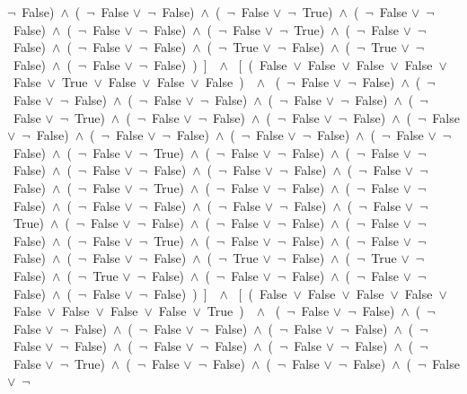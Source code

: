 ﻿\documentclass[a4paper,10pt]{article}
\begin{document}
$\neg$\ False)\ $\wedge$\ (\  $\neg$\ False $\vee$\  $\neg$\ False)\ $\wedge$\ (\  $\neg$\ False $\vee$\  $\neg$\ True)\ $\wedge$\ (\  $\neg$\ False $\vee$\  $\neg$\ False)\ $\wedge$\ (\  $\neg$\ False $\vee$\  $\neg$\ False)\ $\wedge$\ (\  $\neg$\ False $\vee$\  $\neg$\ True)\ $\wedge$\ (\  $\neg$\ False $\vee$\  $\neg$\ False)\ $\wedge$\ (\  $\neg$\ False $\vee$\  $\neg$\ False)\ $\wedge$\ (\  $\neg$\ True $\vee$\  $\neg$\ False)\ $\wedge$\ (\  $\neg$\ True $\vee$\  $\neg$\ False)\ $\wedge$\ (\  $\neg$\ False $\vee$\  $\neg$\ False)\ )\ ]\ \ $\wedge$ \ [\ (\ False\ $\vee$\ False\ $\vee$\ False\ $\vee$\ False\ $\vee$\ False\ $\vee$\ True\ $\vee$\ False\ $\vee$\ False\ $\vee$\ False\ )\ \ $\wedge$ \ (\  $\neg$\ False $\vee$\  $\neg$\ False)\ $\wedge$\ (\  $\neg$\ False $\vee$\  $\neg$\ False)\ $\wedge$\ (\  $\neg$\ False $\vee$\  $\neg$\ False)\ $\wedge$\ (\  $\neg$\ False $\vee$\  $\neg$\ False)\ $\wedge$\ (\  $\neg$\ False $\vee$\  $\neg$\ True)\ $\wedge$\ (\  $\neg$\ False $\vee$\  $\neg$\ False)\ $\wedge$\ (\  $\neg$\ False $\vee$\  $\neg$\ False)\ $\wedge$\ (\  $\neg$\ False $\vee$\  $\neg$\ False)\ $\wedge$\ (\  $\neg$\ False $\vee$\  $\neg$\ False)\ $\wedge$\ (\  $\neg$\ False $\vee$\  $\neg$\ False)\ $\wedge$\ (\  $\neg$\ False $\vee$\  $\neg$\ False)\ $\wedge$\ (\  $\neg$\ False $\vee$\  $\neg$\ True)\ $\wedge$\ (\  $\neg$\ False $\vee$\  $\neg$\ False)\ $\wedge$\ (\  $\neg$\ False $\vee$\  $\neg$\ False)\ $\wedge$\ (\  $\neg$\ False $\vee$\  $\neg$\ False)\ $\wedge$\ (\  $\neg$\ False $\vee$\  $\neg$\ False)\ $\wedge$\ (\  $\neg$\ False $\vee$\  $\neg$\ False)\ $\wedge$\ (\  $\neg$\ False $\vee$\  $\neg$\ True)\ $\wedge$\ (\  $\neg$\ False $\vee$\  $\neg$\ False)\ $\wedge$\ (\  $\neg$\ False $\vee$\  $\neg$\ False)\ $\wedge$\ (\  $\neg$\ False $\vee$\  $\neg$\ False)\ $\wedge$\ (\  $\neg$\ False $\vee$\  $\neg$\ False)\ $\wedge$\ (\  $\neg$\ False $\vee$\  $\neg$\ True)\ $\wedge$\ (\  $\neg$\ False $\vee$\  $\neg$\ False)\ $\wedge$\ (\  $\neg$\ False $\vee$\  $\neg$\ False)\ $\wedge$\ (\  $\neg$\ False $\vee$\  $\neg$\ False)\ $\wedge$\ (\  $\neg$\ False $\vee$\  $\neg$\ True)\ $\wedge$\ (\  $\neg$\ False $\vee$\  $\neg$\ False)\ $\wedge$\ (\  $\neg$\ False $\vee$\  $\neg$\ False)\ $\wedge$\ (\  $\neg$\ False $\vee$\  $\neg$\ False)\ $\wedge$\ (\  $\neg$\ True $\vee$\  $\neg$\ False)\ $\wedge$\ (\  $\neg$\ True $\vee$\  $\neg$\ False)\ $\wedge$\ (\  $\neg$\ True $\vee$\  $\neg$\ False)\ $\wedge$\ (\  $\neg$\ False $\vee$\  $\neg$\ False)\ $\wedge$\ (\  $\neg$\ False $\vee$\  $\neg$\ False)\ $\wedge$\ (\  $\neg$\ False $\vee$\  $\neg$\ False)\ )\ ]\ \ $\wedge$ \ [\ (\ False\ $\vee$\ False\ $\vee$\ False\ $\vee$\ False\ $\vee$\ False\ $\vee$\ False\ $\vee$\ False\ $\vee$\ False\ $\vee$\ True\ )\ \ $\wedge$ \ (\  $\neg$\ False $\vee$\  $\neg$\ False)\ $\wedge$\ (\  $\neg$\ False $\vee$\  $\neg$\ False)\ $\wedge$\ (\  $\neg$\ False $\vee$\  $\neg$\ False)\ $\wedge$\ (\  $\neg$\ False $\vee$\  $\neg$\ False)\ $\wedge$\ (\  $\neg$\ False $\vee$\  $\neg$\ False)\ $\wedge$\ (\  $\neg$\ False $\vee$\  $\neg$\ False)\ $\wedge$\ (\  $\neg$\ False $\vee$\  $\neg$\ False)\ $\wedge$\ (\  $\neg$\ False $\vee$\  $\neg$\ True)\ $\wedge$\ (\  $\neg$\ False $\vee$\  $\neg$\ False)\ $\wedge$\ (\  $\neg$\ False $\vee$\  $\neg$\ False)\ $\wedge$\ (\  $\neg$\ False $\vee$\  $\neg$\ 
\end{document}
